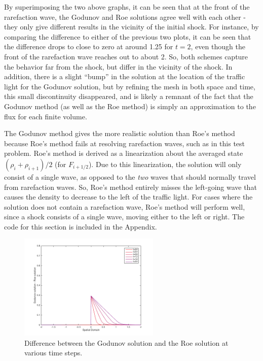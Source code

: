 \documentclass[10pt]{article}
\begin{document}
By superimposing the two above graphs, it can be seen that at the front of the rarefaction wave, the Godunov and Roe solutions agree well with each other - they only give different results in the vicinity of the initial shock. For instance, by comparing the difference to either of the previous two plots, it can be seen that the difference drops to close to zero at around 1.25 for \(t=2\), even though the front of the rarefaction wave reaches out to about 2. So, both schemes capture the behavior far from the shock, but differ in the vicinity of the shock. In addition, there is a slight ``bump'' in the solution at the location of the traffic light for the Godunov solution, but by refining the mesh in both space and time, this small discontinuity disappeared, and is likely a remnant of the fact that the Godunov method (as well as the Roe method) is simply an approximation to the flux for each finite volume. 

The Godunov method gives the more realistic solution than Roe's method because Roe's method fails at resolving rarefaction waves, such as in this test problem. Roe's method is derived as a linearization about the averaged state \((\rho_i+\rho_{i+1})/2\) (for \(F_{i+1/2}\)). Due to this linearization, the solution will only consist of a single wave, as opposed to the \textit{two} waves that should normally travel from rarefaction waves. So, Roe's method entirely misses the left-going wave that causes the density to decrease to the left of the traffic light. For cases where the solution does not contain a rarefaction wave, Roe's method will perform well, since a shock consists of a single wave, moving either to the left or right. The code for this section is included in the Appendix.

\begin{figure}[H]
\centering
\includegraphics[width=0.6\textwidth]{figures/difference1.png}
\caption{Difference between the Godunov solution and the Roe solution at various time steps.}
\end{figure}
\end{document}
